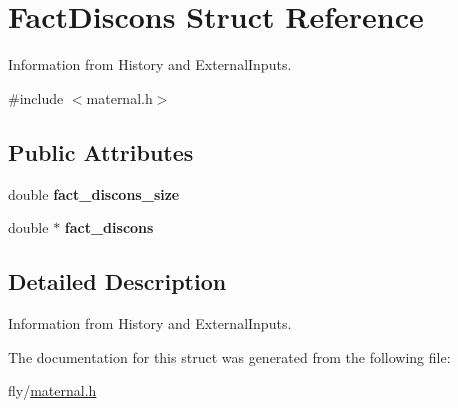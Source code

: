 \hypertarget{structFactDiscons}{
\section{FactDiscons Struct Reference}
\label{structFactDiscons}
}


Information from History and ExternalInputs.  


{\ttfamily \#include $<$maternal.h$>$}\subsection*{Public Attributes}
\begin{DoxyCompactItemize}
\item 
\hypertarget{structFactDiscons_a769b911f04e8a831cb834396e8223e1c}{
double {\bfseries fact\_\-discons\_\-size}}
\label{structFactDiscons_a769b911f04e8a831cb834396e8223e1c}

\item 
\hypertarget{structFactDiscons_aa13c9c2ef705123c2e3cc5d4a3cc840a}{
double $\ast$ {\bfseries fact\_\-discons}}
\label{structFactDiscons_aa13c9c2ef705123c2e3cc5d4a3cc840a}

\end{DoxyCompactItemize}


\subsection{Detailed Description}
Information from History and ExternalInputs. 

The documentation for this struct was generated from the following file:\begin{DoxyCompactItemize}
\item 
fly/\hyperlink{maternal_8h}{maternal.h}\end{DoxyCompactItemize}
